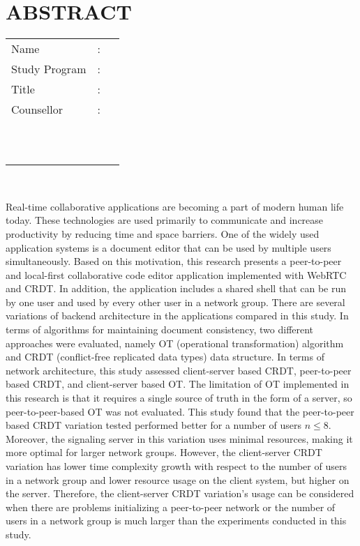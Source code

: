 %
%
%

\chapter*{ABSTRACT}
\singlespacing

\vspace*{0.2cm}

\def\blank{}

\noindent \begin{tabular}{l l p{11.0cm}}
	Name&: & \penulis \\
	Study Program&: & \studyProgram \\
	Title&: & \judulInggris \\
	Counsellor&: & \pembimbingSatu \\
	\ifx\blank\pembimbingDua
	\else
		\ &\ & \pembimbingDua \\
	\fi
	\ifx\blank\pembimbingTiga
	\else
		\ &\ & \pembimbingTiga \\
	\fi
\end{tabular} \\

\vspace*{0.5cm}

\noindent Real-time collaborative applications are becoming a part of modern human life today. These technologies are used primarily to communicate and increase productivity by reducing time and space barriers. One of the widely used application systems is a document editor that can be used by multiple users simultaneously. Based on this motivation, this research presents a peer-to-peer and local-first collaborative code editor application implemented with WebRTC and CRDT. In addition, the application includes a shared shell that can be run by one user and used by every other user in a network group. There are several variations of backend architecture in the applications compared in this study. In terms of algorithms for maintaining document consistency, two different approaches were evaluated, namely OT (operational transformation) algorithm and CRDT (conflict-free replicated data types) data structure. In terms of network architecture, this study assessed client-server based CRDT, peer-to-peer based CRDT, and client-server based OT. The limitation of OT implemented in this research is that it requires a single source of truth in the form of a server, so peer-to-peer-based OT was not evaluated. This study found that the peer-to-peer based CRDT variation tested performed better for a number of users $n \leq 8$. Moreover, the signaling server in this variation uses minimal resources, making it more optimal for larger network groups. However, the client-server CRDT variation has lower time complexity growth with respect to the number of users in a network group and lower resource usage on the client system, but higher on the server. Therefore, the client-server CRDT variation's usage can be considered when there are problems initializing a peer-to-peer network or the number of users in a network group is much larger than the experiments conducted in this study. \\

